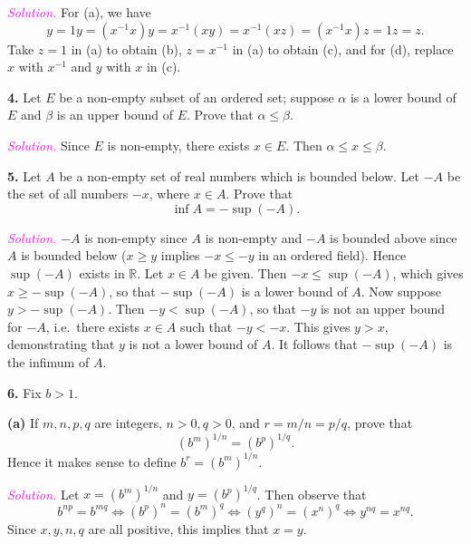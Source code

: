 \documentclass[12pt]{article}
\newcommand{\newp}{\vspace{5mm}}
\theoremstyle{definition}
\begin{document}
\textit{\textcolor{magenta}{Solution.}} For (a), we have
\[
    y = 1y = (x^{-1} x) y = x^{-1} (xy) = x^{-1} (xz) = (x^{-1} x) z = 1z = z.
\]
Take \( z = 1 \) in (a) to obtain (b), \( z = x^{-1} \) in (a) to obtain (c), and for (d), replace \( x \) with \( x^{-1} \) and \( y \) with \( x \) in (c).

\newp

\textbf{4.} Let \( E \) be a non-empty subset of an ordered set; suppose \( \alpha \) is a lower bound of \( E \) and \( \beta \) is an upper bound of \( E \). Prove that \( \alpha \leq \beta \).

\newp

\textit{\textcolor{magenta}{Solution.}} Since \( E \) is non-empty, there exists \( x \in E \). Then \( \alpha \leq x \leq \beta \).

\newp

\textbf{5.} Let \( A \) be a non-empty set of real numbers which is bounded below. Let \( -A \) be the set of all numbers \( -x \), where \( x \in A \). Prove that
\[
\inf A = -\sup (-A).
\]

\textit{\textcolor{magenta}{Solution.}} \( -A \) is non-empty since \( A \) is non-empty and \( -A \) is bounded above since \( A \) is bounded below (\( x \geq y \) implies \( -x \leq -y \) in an ordered field). Hence \( \sup (-A) \) exists in \( \mathbb{R} \). Let \( x \in A \) be given. Then \( -x \leq \sup (-A) \), which gives \( x \geq -\sup (-A) \), so that \( -\sup (-A) \) is a lower bound of \( A \). Now suppose \( y > -\sup (-A) \). Then \( -y < \sup (-A) \), so that \( -y \) is not an upper bound for \( -A \), i.e.\ there exists \( x \in A \) such that \( -y < -x \). This gives \( y > x \), demonstrating that \( y \) is not a lower bound of \( A \). It follows that \( - \sup(-A) \) is the infimum of \( A \).

\newp

\textbf{6.} Fix \( b > 1 \).

\textbf{(a)} If \( m, n, p, q \) are integers, \( n > 0, q > 0 \), and \( r = m/n = p/q \), prove that
\[
(b^m)^{1/n} = (b^p)^{1/q}.
\]
Hence it makes sense to define \( b^r = (b^m)^{1/n} \).
\newp

\textit{\textcolor{magenta}{Solution.}} Let \( x = (b^m)^{1/n} \) and \( y = (b^p)^{1/q} \). Then observe that
\[
b^{np} = b^{mq} \iff (b^p)^n = (b^m)^q \iff (y^q)^n = (x^n)^q \iff y^{nq} = x^{nq}.
\]
Since \( x, y, n, q \) are all positive, this implies that \( x = y \).

\newp
\end{document}
